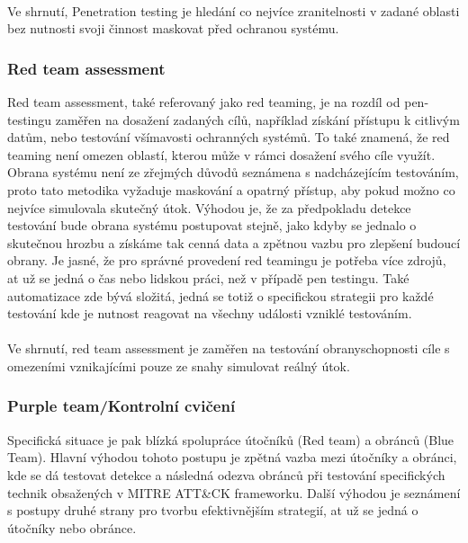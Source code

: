 \paragraph{}
Ve shrnutí, Penetration testing je hledání co nejvíce zranitelnosti v zadané oblasti bez nutnosti svoji činnost maskovat před ochranou systému.\cite{securityInteligence_pen_test_red_team_purple_team, lootsec_pen_test_vs_red_team, astra_pen_test_vs_red_teaming}


\subsubsection{Red team assessment}

Red team assessment, také referovaný jako red teaming, je na rozdíl od pen-testingu zaměřen na dosažení zadaných cílů, například získání přístupu k citlivým datům, nebo testování všímavosti ochranných systémů.
To také znamená, že red teaming není omezen oblastí, kterou může v rámci dosažení svého cíle využít.
Obrana systému není ze zřejmých důvodů seznámena s nadcházejícím testováním, proto tato metodika vyžaduje maskování a opatrný přístup, aby pokud možno co nejvíce simulovala skutečný útok.
Výhodou je, že za předpokladu detekce testování bude obrana systému postupovat stejně, jako kdyby se jednalo o skutečnou hrozbu a získáme tak cenná data a zpětnou vazbu pro zlepšení budoucí obrany.
Je jasné, že pro správné provedení red teamingu je potřeba více zdrojů, at už se jedná o čas nebo lidskou práci, než v případě pen testingu.
Také automatizace zde bývá složitá, jedná se totiž o specifickou strategii pro každé testování kde je nutnost reagovat na všechny události vzniklé testováním.\cite{securityInteligence_pen_test_red_team_purple_team, lootsec_pen_test_vs_red_team, astra_pen_test_vs_red_teaming}

\paragraph{}
Ve shrnutí, red team assessment je zaměřen na testování obranyschopnosti cíle s omezeními vznikajícími pouze ze snahy simulovat reálný útok.


\subsubsection{Purple team/Kontrolní cvičení}
Specifická situace je pak blízká spolupráce útočníků (Red team) a obránců (Blue Team).
Hlavní výhodou tohoto postupu je zpětná vazba mezi útočníky a obránci, kde se dá testovat detekce a následná odezva obránců při testování specifických technik obsažených v MITRE ATT\&CK frameworku.
Další výhodou je seznámení s postupy druhé strany pro tvorbu efektivnějším strategií, at už se jedná o útočníky nebo obránce.
